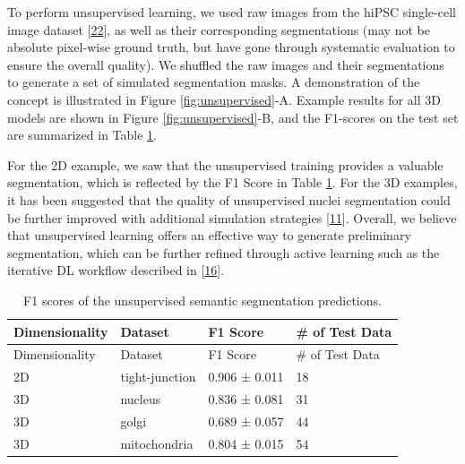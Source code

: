 To perform unsupervised learning, we used raw images from the hiPSC single-cell image dataset {[}\protect\hyperlink{ref-5sGcmDuy}{22}{]}, as well as their corresponding segmentations (may not be absolute pixel-wise ground truth, but have gone through systematic evaluation to ensure the overall quality). We shuffled the raw images and their segmentations to generate a set of simulated segmentation masks. A demonstration of the concept is illustrated in Figure \ref{fig:unsupervised}-A. Example results for all 3D models are shown in Figure \ref{fig:unsupervised}-B, and the F1-scores on the test set are summarized in Table \ref{tbl:unsuper}.

For the 2D example, we saw that the unsupervised training provides a valuable segmentation, which is reflected by the F1 Score in Table \ref{tbl:unsuper}. For the 3D examples, it has been suggested that the quality of unsupervised nuclei segmentation could be further improved with additional simulation strategies {[}\protect\hyperlink{ref-RuFP3CS3}{11}{]}. Overall, we believe that unsupervised learning offers an effective way to generate preliminary segmentation, which can be further refined through active learning such as the iterative DL workflow described in {[}\protect\hyperlink{ref-jM3v1UjQ}{16}{]}.

\begin{longtable}[]{@{}llll@{}}
\caption{F1 scores of the unsupervised semantic segmentation predictions. \label{tbl:unsuper}}\label{tbl:unsuper}\tabularnewline
\toprule()
Dimensionality & Dataset & F1 Score & \# of Test Data \\
\midrule()
\endfirsthead
\toprule()
Dimensionality & Dataset & F1 Score & \# of Test Data \\
\midrule()
\endhead
2D & tight-junction & 0.906 ± 0.011 & 18 \\
3D & nucleus & 0.836 ± 0.081 & 31 \\
3D & golgi & 0.689 ± 0.057 & 44 \\
3D & mitochondria & 0.804 ± 0.015 & 54 \\
\bottomrule()
\end{longtable}

